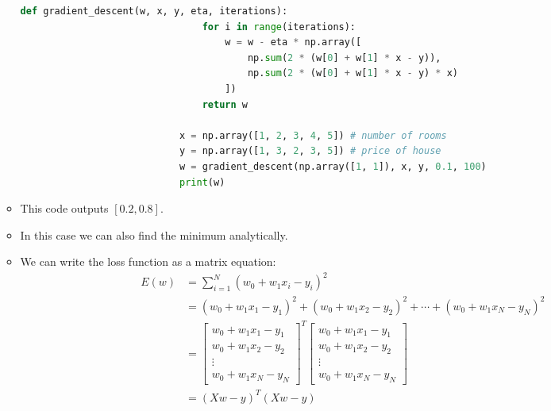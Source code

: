 \documentclass[12pt]{article}
\begin{document}
\begin{itemize}
\begin{itemize}
\begin{lstlisting}[language=Python,gobble=28]
                            def gradient_descent(w, x, y, eta, iterations):
                                for i in range(iterations):
                                    w = w - eta * np.array([
                                        np.sum(2 * (w[0] + w[1] * x - y)),
                                        np.sum(2 * (w[0] + w[1] * x - y) * x)
                                    ])
                                return w

                            x = np.array([1, 2, 3, 4, 5]) # number of rooms
                            y = np.array([1, 3, 2, 3, 5]) # price of house
                            w = gradient_descent(np.array([1, 1]), x, y, 0.1, 100)
                            print(w)
                        \end{lstlisting}
                        \item This code outputs $[0.2, 0.8]$.
                        \item In this case we can also find the minimum analytically.
                        \item We can write the loss function as a matrix equation:
                        \begin{align*}
                            E(w) &= \sum_{i=1}^N {(w_0 + w_1x_i - y_i)}^2\\
                            &= {(w_0 + w_1x_1 - y_1)}^2 + {(w_0 + w_1x_2 - y_2)}^2 + \cdots + {(w_0 + w_1x_N - y_N)}^2\\
                            &= \begin{bmatrix}
                                w_0 + w_1x_1 - y_1\\
                                w_0 + w_1x_2 - y_2\\
                                \vdots\\
                                w_0 + w_1x_N - y_N
                            \end{bmatrix}^T
                            \begin{bmatrix}
                                w_0 + w_1x_1 - y_1\\
                                w_0 + w_1x_2 - y_2\\
                                \vdots\\
                                w_0 + w_1x_N - y_N
                            \end{bmatrix}\\
                            &= {(Xw - y)}^T(Xw - y)
                        \end{align*}

\end{itemize}
\end{itemize}
\end{document}
